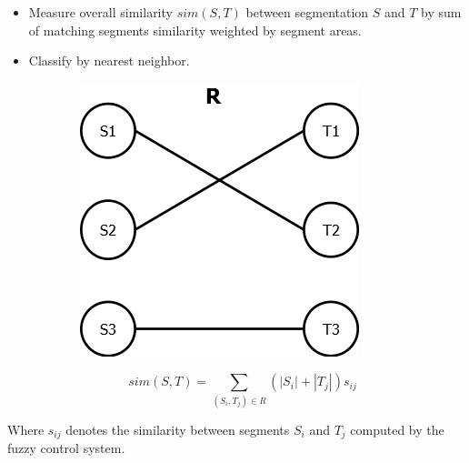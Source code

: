 \documentclass{beamer}
\begin{document}
\begin{frame}
\begin{itemize}
\item Measure overall similarity $sim(S,T)$ between segmentation $S$ and $T$ by sum of matching segments similarity weighted by segment areas.
\item Classify by nearest neighbor.
\end{itemize}

\begin{figure}
\centering
\begin{subfigure}{0.3\textwidth}
\centering
\includegraphics[width=\textwidth]{../images/relation.png}
\end{subfigure}
\begin{subfigure}{0.5\textwidth}
\centering
\[ \quad sim(S,T) = \sum_{(S_i,T_j) \in R}(|S_i| + |T_j|)s_{ij}\]
\end{subfigure}
\end{figure}

Where $s_{ij}$ denotes the similarity between segments $S_i$ and $T_j$ computed by the fuzzy control system.

\end{frame}
\end{document}
